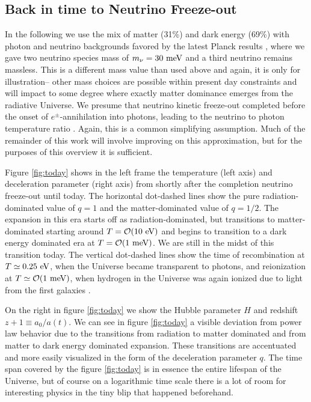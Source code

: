 \subsection{Back in time to Neutrino Freeze-out}\label{recomb}
In the following we use the mix of matter  (31\%) and dark energy (69\%) with photon and neutrino backgrounds favored by the latest Planck results \cite{Planck}, where we gave two neutrino species mass of $m_\nu=30\text{ meV}$ and a third neutrino remains  massless.  This is a different mass value than used above and again, it is only for illustration-- other mass choices are possible within present day constraints and will impact to some degree where exactly matter dominance emerges from the radiative Universe.  We presume  that neutrino kinetic freeze-out completed before the onset of $e^\pm$-annihilation into  photons, leading to the neutrino to photon temperature ratio . Again, this is a common simplifying assumption.  Much of the remainder of this work will involve improving on this approximation, but for the purposes of this overview it is sufficient.

Figure \ref{fig:today} shows in the left frame the temperature  (left axis) and deceleration parameter (right axis)  from shortly after the completion neutrino freeze-out until today.  The horizontal dot-dashed lines show  the pure radiation-dominated value of $q=1$ and the matter-dominated value of $q=1/2$. The expansion in this era starts off as radiation-dominated, but transitions to matter-dominated starting around $T=\mathcal{O}(10\text{ eV})$ and begins to transition to a dark energy dominated era at $T=\mathcal{O}(1\text{ meV})$. We are still in the midst of this transition today. The vertical dot-dashed lines show  the time of recombination at $T\simeq0.25\text{ eV}$, when the Universe became transparent to photons, and reionization at $T\simeq {\cal O}(1\meV)$, when hydrogen in the Universe was again ionized due to light from the first galaxies \cite{Zaroubi:2012in}. 

On the right in figure  \ref{fig:today}  we show the Hubble parameter $H$ and redshift $z+1\equiv a_0/a(t)$. We can see in figure \ref{fig:today} a visible deviation from power law behavior due to the transitions from radiation to matter dominated and from matter to dark energy dominated expansion.  These transitions are accentuated and more easily visualized in the form of the deceleration parameter $q$. The time span covered by the figure  \ref{fig:today} is in essence the entire lifespan of the Universe, but of course on a logarithmic time scale there is a lot of room for interesting physics in the tiny blip that happened beforehand.



